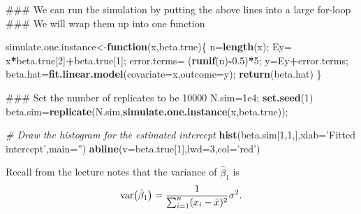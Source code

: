 \documentclass[12pt,]{book}
\newenvironment{Shaded}{\begin{snugshade}}{\end{snugshade}}
\newcommand{\KeywordTok}[1]{\textcolor[rgb]{0.13,0.29,0.53}{\textbf{#1}}}
\newcommand{\DataTypeTok}[1]{\textcolor[rgb]{0.13,0.29,0.53}{#1}}
\newcommand{\DecValTok}[1]{\textcolor[rgb]{0.00,0.00,0.81}{#1}}
\newcommand{\FloatTok}[1]{\textcolor[rgb]{0.00,0.00,0.81}{#1}}
\newcommand{\StringTok}[1]{\textcolor[rgb]{0.31,0.60,0.02}{#1}}
\newcommand{\CommentTok}[1]{\textcolor[rgb]{0.56,0.35,0.01}{\textit{#1}}}
\newcommand{\ControlFlowTok}[1]{\textcolor[rgb]{0.13,0.29,0.53}{\textbf{#1}}}
\newcommand{\OperatorTok}[1]{\textcolor[rgb]{0.81,0.36,0.00}{\textbf{#1}}}
\newcommand{\NormalTok}[1]{#1}
\begin{document}
\begin{Shaded}
\begin{Highlighting}[]
\NormalTok{### We can run the simulation by putting the above lines into a large for-loop}
\NormalTok{### We will wrap them up into one function}

\NormalTok{simulate.one.instance<-}\ControlFlowTok{function}\NormalTok{(x,beta.true)\{}
\NormalTok{  n=}\KeywordTok{length}\NormalTok{(x);}
\NormalTok{  Ey=}\StringTok{ }\NormalTok{x}\OperatorTok{*}\NormalTok{beta.true[}\DecValTok{2}\NormalTok{]}\OperatorTok{+}\NormalTok{beta.true[}\DecValTok{1}\NormalTok{];}
\NormalTok{  error.terms=}\StringTok{ }\NormalTok{(}\KeywordTok{runif}\NormalTok{(n)}\OperatorTok{-}\FloatTok{0.5}\NormalTok{)}\OperatorTok{*}\DecValTok{5}\NormalTok{;}
\NormalTok{  y=Ey}\OperatorTok{+}\NormalTok{error.terms;}
\NormalTok{  beta.hat=}\KeywordTok{fit.linear.model}\NormalTok{(}\DataTypeTok{covariate=}\NormalTok{x,}\DataTypeTok{outcome=}\NormalTok{y);}
  \KeywordTok{return}\NormalTok{(beta.hat)}
\NormalTok{\}}

\NormalTok{### Set the number of replicates to be 10000}
\NormalTok{N.sim=}\FloatTok{1e4}\NormalTok{;}
\KeywordTok{set.seed}\NormalTok{(}\DecValTok{1}\NormalTok{)}
\NormalTok{beta.sim=}\KeywordTok{replicate}\NormalTok{(N.sim,}\KeywordTok{simulate.one.instance}\NormalTok{(x,beta.true));}


\CommentTok{# Draw the histogram for the estimated intercept }
\KeywordTok{hist}\NormalTok{(beta.sim[}\DecValTok{1}\NormalTok{,}\DecValTok{1}\NormalTok{,],}\DataTypeTok{xlab=}\StringTok{'Fitted intercept'}\NormalTok{,}\DataTypeTok{main=}\StringTok{''}\NormalTok{)}
\KeywordTok{abline}\NormalTok{(}\DataTypeTok{v=}\NormalTok{beta.true[}\DecValTok{1}\NormalTok{],}\DataTypeTok{lwd=}\DecValTok{3}\NormalTok{,}\DataTypeTok{col=}\StringTok{'red'}\NormalTok{)}
\end{Highlighting}
\end{Shaded}

Recall from the lecture notes that the variance of \(\hat{\beta}_1\) is
\[{\rm var}\big(\hat{\beta}_1\big)=\frac{1}{\sum_{i=1}^n (x_i-\bar{x})^2} \sigma^2.\]
\end{document}
